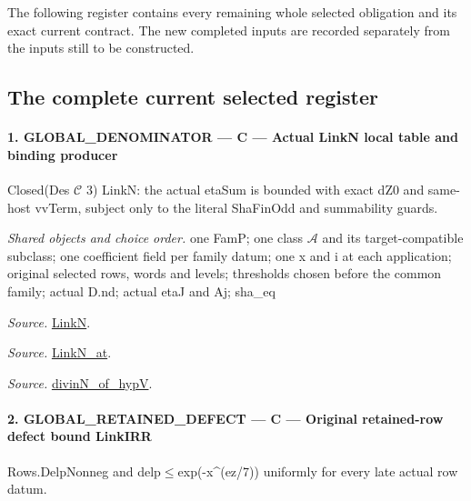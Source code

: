 The following register contains every remaining whole selected
obligation and its exact current contract. The new completed inputs
are recorded separately from the inputs still to be constructed.

\subsection{The complete current selected register}

\paragraph{1. GLOBAL\_\allowbreak DENOMINATOR — C — Actual LinkN local table and binding producer}

Closed(Des $\mathcal C$ 3) LinkN: the actual etaSum is bounded with exact dZ0 and same-host vvTerm, subject only to the literal ShaFinOdd and summability guards.

\emph{Shared objects and choice order.} one FamP; one class $\mathcal A$ and its target-compatible subclass; one coefficient field per family datum; one x and i at each application; original selected rows, words and levels; thresholds chosen before the common family; actual D.nd; actual etaJ and Aj; sha\_\allowbreak eq

\emph{Source.} \href{https://github.com/CocoSgt/riemann-hypothesis-lean/blob/7cbf7a0c32fca1badf05931879a37c3f8a2b03b4/src/Formalism/SharpRestriction/GlobalTheoremInputs.lean#L45-L48}{LinkN}.

\emph{Source.} \href{https://github.com/CocoSgt/riemann-hypothesis-lean/blob/7cbf7a0c32fca1badf05931879a37c3f8a2b03b4/src/Formalism/SharpRestriction/GlobalTheoremInputs.lean#L40-L44}{LinkN\_\allowbreak at}.

\emph{Source.} \href{https://github.com/CocoSgt/riemann-hypothesis-lean/blob/7cbf7a0c32fca1badf05931879a37c3f8a2b03b4/src/Development/AutomorphicArithmetic/CharacterBoxes/DivinNOfHypV.lean#L117-L134}{divinN\_\allowbreak of\_\allowbreak hypV}.



\paragraph{2. GLOBAL\_\allowbreak RETAINED\_\allowbreak DEFECT — C — Original retained-row defect bound LinkIRR}

Rows.DelpNonneg and delp$\le$exp(-x\textasciicircum{}(ez/7)) uniformly for every late actual row datum.

